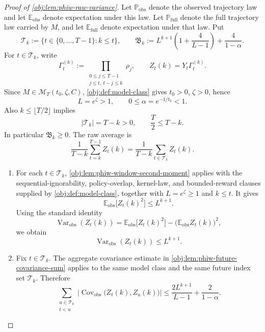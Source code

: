 \begin{proof}[Proof of \cref{obj:lem:phiw-raw-variance}]
Let \(\mathbb P_{\mathrm{obs}}\) denote the observed trajectory law and let
\(\mathbb E_{\mathrm{obs}}\) denote expectation under this law.  Let
\(\mathbb P_{\mathrm{full}}\) denote the full trajectory law carried by \(M\),
and let \(\mathbb E_{\mathrm{full}}\) denote expectation under that law.  Put
\[
\mathscr T_k:=\{t\in\{0,\ldots,T-1\}: k\le t\},
\qquad
\mathfrak B_k:=
L^{k+1}\left(1+\frac{4}{L-1}\right)+\frac{4}{1-\alpha}.
\]
For \(t\in\mathscr T_k\), write
\[
\Gamma_t^{(k)}
:=
\prod_{\substack{0\le j\le T-1\\ j\le t,\ t-j\le k}}\rho_j,
\qquad
Z_t(k)=Y_t\Gamma_t^{(k)} .
\]
Since \(M\in\mathcal M_T(t_0,\zeta,C)\), \cref{obj:def:model-class} gives
\(t_0>0\), \(\zeta>0\), hence
\[
L=e^\zeta>1,
\qquad
0\le \alpha=e^{-1/t_0}<1.
\]
Also \(k\le \lfloor T/2\rfloor\) implies
\[
|\mathscr T_k|=T-k>0,
\qquad
\frac{T}{2}\le T-k.
\]
In particular \(\mathfrak B_k\ge0\).  The raw average is
\[
\frac{1}{T-k}\sum_{t=k}^{T-1} Z_t(k)
=
\frac{1}{T-k}\sum_{t\in\mathscr T_k}Z_t(k).
\]

\begin{enumerate}
\item
For each \(t\in\mathscr T_k\), \cref{obj:lem:phiw-window-second-moment} applies with the sequential-ignorability, policy-overlap, kernel-law, and bounded-reward clauses supplied by \cref{obj:def:model-class}, together with \(L=e^\zeta\ge 1\) and \(k\le t\).  It gives
\[
\mathbb E_{\mathrm{obs}}\bigl[Z_t(k)^2\bigr]
\le L^{k+1}.
\]
Using the standard identity
\[
\operatorname{Var}_{\mathrm{obs}}(Z_t(k))
=
\mathbb E_{\mathrm{obs}}\bigl[Z_t(k)^2\bigr]
-\bigl(\mathbb E_{\mathrm{obs}}Z_t(k)\bigr)^2,
\]
we obtain
\[
\operatorname{Var}_{\mathrm{obs}}(Z_t(k))
\le L^{k+1}.
\]

\item
Fix \(t\in\mathscr T_k\).  The aggregate covariance estimate in \cref{obj:lem:phiw-future-covariance-sum} applies to the same model class and the same future index set \(\mathscr T_k\).  Therefore
\[
\sum_{\substack{u\in\mathscr T_k\\ t<u}}
\left|\operatorname{Cov}_{\mathrm{obs}}\bigl(Z_t(k),Z_u(k)\bigr)\right|
\le
\frac{2L^{k+1}}{L-1}+\frac{2}{1-\alpha}.
\]


\end{enumerate}
\end{proof}
